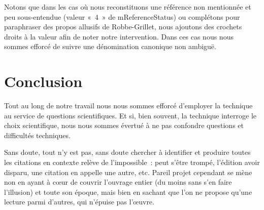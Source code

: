 \documentclass[12pt, a4paper]{article}
\begin{document}
Notons que dans les cas où nous reconstituons une référence non mentionnée et peu sous-entendue (valeur «~4~» de mReferenceStatus) ou complétons pour paraphraser des propos allusifs de Robbe-Grillet, nous ajoutons des crochets droits à la valeur afin de noter notre intervention. Dans ces cas nous nous sommes efforcé de suivre une dénomination canonique non ambiguë.









\section{Conclusion}

Tout au long de notre travail nous nous sommes efforcé d'employer la technique au service de questions scientifiques. Et si, bien souvent, la technique interroge le choix scientifique, nous nous sommes évertué à ne pas confondre questions et difficultés techniques. 

Sans doute, tout n'y est pas, sans doute chercher à identifier et produire toutes les citations en contexte relève de l'impossible~: \robbe{} peut s'être trompé, l'édition avoir disparu, une citation en appelle une autre, etc. Pareil projet cependant se mène non en ayant à cœur de couvrir l'ouvrage entier (du moins sans s'en faire l'illusion) et toute son époque, mais bien en sachant que l'on ne propose qu'une lecture parmi d'autres, qui n'épuise pas l'œuvre.
\end{document}
